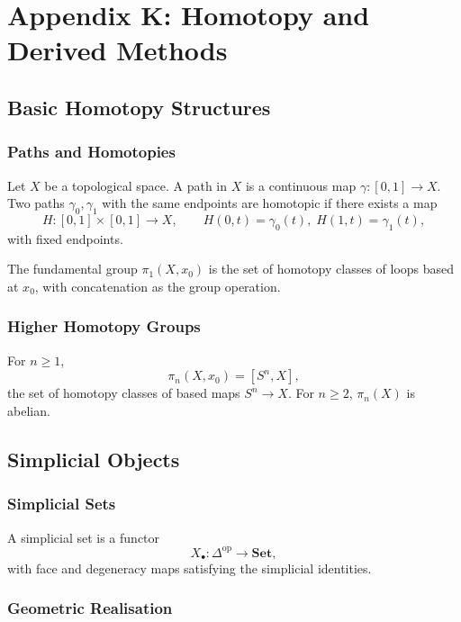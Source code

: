 \chapter*{Appendix K: Homotopy and Derived Methods}

\section{Basic Homotopy Structures}

\subsection{Paths and Homotopies}

Let $X$ be a topological space.  
A path in $X$ is a continuous map $\gamma : [0,1] \to X$.  
Two paths $\gamma_0,\gamma_1$ with the same endpoints are homotopic if there exists a map
\[
H : [0,1]\times[0,1] \to X,
\qquad
H(0,t)=\gamma_0(t),\;
H(1,t)=\gamma_1(t),
\]
with fixed endpoints.

\begin{definition}
The fundamental group $\pi_1(X,x_0)$ is the set of homotopy classes of loops based at $x_0$, with concatenation as the group operation.
\end{definition}

\subsection{Higher Homotopy Groups}

For $n\ge 1$,
\[
\pi_n(X,x_0) = [S^n,X],
\]
the set of homotopy classes of based maps $S^n\to X$.  
For $n\ge 2$, $\pi_n(X)$ is abelian.

\section{Simplicial Objects}

\subsection{Simplicial Sets}

A simplicial set is a functor
\[
X_\bullet : \Delta^{\mathrm{op}} \to \mathbf{Set},
\]
with face and degeneracy maps satisfying the simplicial identities.

\subsection{Geometric Realisation}

